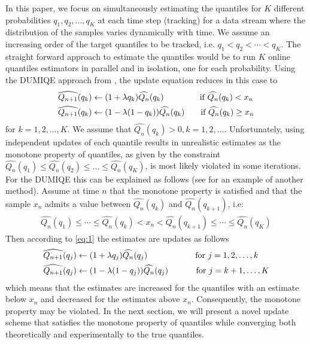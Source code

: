 \documentclass[10pt, a4paper]{article}
\newtheorem{rational for conjecture}{Rational for Conjecture}
\begin{document}
In this paper, we focus on simultaneously estimating the quantiles for $K$ different probabilities $q_1, q_2, \ldots, q_K$ at each time step (tracking) for a data stream where the distribution of the samples varies dynamically with time. We assume an increasing order of the target quantiles to be tracked, i.e. $q_1 < q_2 < \cdots < q_K$.
The straight forward approach to estimate the quantiles would be to run $K$ online quantiles estimators in parallel and in isolation, one for each probability. Using the DUMIQE approach from \cite{yazidi16}, the update equation reduces in this case to
\begin{align}
\label{eq:1}
  \begin{split}
   \widehat{Q_{n+1}}(q_k) &\leftarrow (1 + \lambda q_k) \widehat{Q_{n}}(q_k)  \hspace{14mm}\text{ if } \widehat{Q_{n}}(q_k) < x_n \\
   \widehat{Q_{n+1}}(q_k) &\leftarrow (1 - \lambda (1-q_k)) \widehat{Q_{n}}(q_k)  \,\hspace{5mm}\text{ if } \widehat{Q_{n}}(q_k) \geq x_n
  \end{split}
\end{align}
for $k = 1,2, \ldots, K$. We assume that $\widehat{Q_{n}}(q_k) > 0, k = 1,2, \ldots$. %
Unfortunately, using independent updates of each quantile results in unrealistic estimates as the monotone property of quantiles, as given by the constraint $\widehat{Q_{n}}(q_1) \leq \widehat{Q_{n}}(q_2) \leq \ldots \leq \widehat{Q_{n}}(q_K)$,
is most likely violated in some iterations. For the DUMIQE this can be explained as follows (see \cite{cao2009incremental} for an example of another method). Assume at time $n$ that the monotone property is satisfied and that the sample $x_n$ admits a value between $\widehat{Q_{n}}(q_k)$ and $\widehat{Q_{n}}(q_{k+1})$, i.e:
\begin{align}
\label{eq:2}
\widehat{Q_{n}}(q_1) \leq \cdots \leq \widehat{Q_{n}}(q_k) < x_n < \widehat{Q_{n}}(q_{k+1}) \leq \cdots \leq \widehat{Q_{n}}(q_K)
\end{align}
Then according to \eqref{eq:1} the estimates are updates as follows
\begin{align}
\label{eq:3}
  \begin{split}
  \widehat{Q_{n+1}}(q_j) &\leftarrow (1 + \lambda q_j) \widehat{Q_{n}}(q_j) \hspace{19mm}\text{ for } j = 1,2, \ldots, k\\
  \widehat{Q_{n+1}}(q_{j}) &\leftarrow (1 - \lambda (1-q_{j})) \widehat{Q_{n}}(q_{j}) \,\hspace{10mm}\text{ for } j = k+1, \ldots, K
  \end{split}
\end{align}
which means that the estimates are increased for the quantiles with an estimate below $x_n$ and decreased for the estimates above $x_n$. Consequently, the monotone property may be violated. In the next section, we will present a novel update scheme that satisfies the monotone property of quantiles while converging both theoretically and experimentally to the true quantiles.
\end{document}

